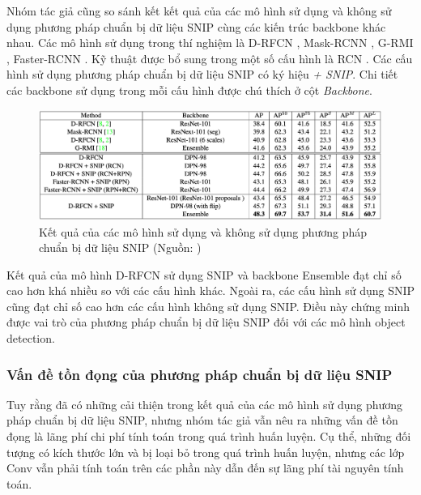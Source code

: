 {    \noindent
    Nhóm tác giả cũng so sánh kết kết quả của các mô hình sử dụng và không sử dụng phương pháp chuẩn bị dữ liệu SNIP cùng các kiến trúc backbone khác nhau.
    Các mô hình sử dụng trong thí nghiệm là D-RFCN \cite{}, Mask-RCNN \cite{}, G-RMI \cite{}, Faster-RCNN \cite{}.
    Kỹ thuật được bổ sung trong một số cấu hình là RCN \cite{}.
    Các cấu hình sử dụng phương pháp chuẩn bị dữ liệu SNIP có ký hiệu \textit{+ SNIP}.
    Chi tiết các backbone sử dụng trong mỗi cấu hình được chú thích ở cột \textit{Backbone}.
    
    \begin{figure}[H]
        \centering
        \includegraphics[width=16cm] {images/snip_results_2}
        \caption{Kết quả của các mô hình sử dụng và không sử dụng phương pháp chuẩn bị dữ liệu SNIP (Nguồn: \cite{singh2018analysis})}
        \label{fig:snip_results_2}
    \end{figure}

    \noindent
    Kết quả của mô hình D-RFCN sử dụng SNIP và backbone Ensemble đạt chỉ số cao hơn khá nhiều so với các cấu hình khác.
    Ngoài ra, các cấu hình sử dụng SNIP cũng đạt chỉ số cao hơn các cấu hình không sử dụng SNIP.
    Điều này chứng minh được vai trò của phương pháp chuẩn bị dữ liệu SNIP đối với các mô hình object detection.

    \subsubsection{Vấn đề tồn đọng của phương pháp chuẩn bị dữ liệu SNIP}
    Tuy rằng đã có những cải thiện trong kết quả của các mô hình sử dụng phương pháp chuẩn bị dữ liệu SNIP, nhưng nhóm tác giả vẫn nêu ra những vấn đề tồn đọng là lãng phí chi phí tính toán trong quá trình huấn luyện.
    Cụ thể, những đối tượng có kích thước lớn và bị loại bỏ trong quá trình huấn luyện, nhưng các lớp Conv  vẫn phải tính toán trên các phần này dẫn đến sự lãng phí tài nguyên tính toán.
}
